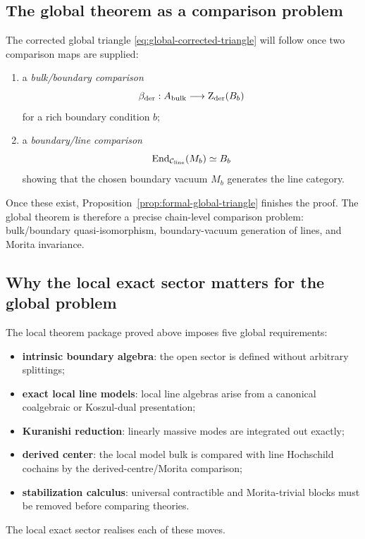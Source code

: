 \subsection{The global theorem as a comparison problem}

The corrected global triangle \eqref{eq:global-corrected-triangle} will follow once two comparison maps are supplied:

\begin{enumerate}[label=(\arabic*),leftmargin=1.8em]
\item a \emph{bulk/boundary comparison}
\[
\beta_{\mathrm{der}}:A_{\mathrm{bulk}}\longrightarrow \operatorname{Z}_{\mathrm{der}}(B_b)
\]
for a rich boundary condition $b$;
\item a \emph{boundary/line comparison}
\[
\operatorname{End}_{\mathcal C_{\mathrm{line}}}(M_b)\simeq B_b
\]
showing that the chosen boundary vacuum $M_b$ generates the line category.
\end{enumerate}

Once these exist, Proposition~\ref{prop:formal-global-triangle}
finishes the proof. The global theorem is therefore a precise
chain-level comparison problem: bulk/boundary quasi-isomorphism,
boundary-vacuum generation of lines, and Morita invariance.

\subsection{Why the local exact sector matters for the global problem}

The local theorem package proved above imposes five global requirements:
\begin{itemize}[leftmargin=1.8em]
\item \textbf{intrinsic boundary algebra}: the open sector is defined without arbitrary splittings;
\item \textbf{exact local line models}: local line algebras arise from a canonical coalgebraic or Koszul-dual presentation;
\item \textbf{Kuranishi reduction}: linearly massive modes are integrated out exactly;
\item \textbf{derived center}: the local model bulk is compared with
 line Hochschild cochains by the derived-centre/Morita comparison;
\item \textbf{stabilization calculus}: universal contractible and Morita-trivial blocks must be removed before comparing theories.
\end{itemize}
The local exact sector realises each of these moves.

